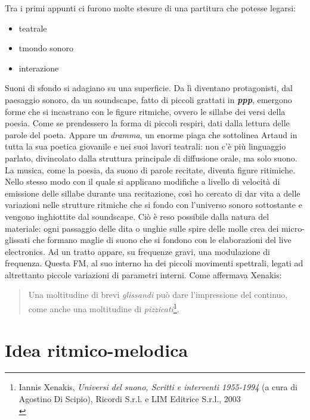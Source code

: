 Tra i primi appunti ci furono molte stesure di una partitura che potesse legarsi: 
\begin{itemize}
\item{teatrale}
\item{tmondo sonoro}
\item{interazione}
\end{itemize}

Suoni di sfondo si adagiano su una superficie. Da lì diventano protagonisti, dal paesaggio sonoro, da un soundscape, fatto di piccoli grattati in \textbf{\textit{ppp}}, emergono forme che si incastrano con le figure ritmiche, ovvero le sillabe dei versi della poesia. Come se prendessero la forma di piccoli respiri, dati dalla lettura delle parole del poeta. Appare un \textit{dramma}, un enorme piaga che sottolinea Artaud in tutta la sua poetica giovanile e nei suoi lavori teatrali: non c'è più linguaggio parlato, divincolato dalla struttura principale di diffusione orale, ma solo suono. La musica, come la poesia, da suono di parole recitate, diventa figure ritimiche. \\
Nello stesso modo con il quale si applicano modifiche a livello di velocità di emissione delle sillabe durante una recitazione, così ho cercato di dar vita a delle variazioni nelle strutture ritmiche che si fondo con l'universo sonoro sottostante e vengono inghiottite dal soundscape. Ciò è reso possibile dalla natura del materiale: ogni passaggio delle dita o unghie sulle spire delle molle crea dei micro-glissati che formano maglie di suono che si fondono con le elaborazioni del live electronics. Ad un tratto appare, su frequenze gravi, una modulazione di frequenza. Questa FM, al suo interno ha dei piccoli movimenti spettrali, legati ad altrettanto piccole variazioni di parametri interni. Come affermava Xenakis:
\begin{quotation}
Una moltitudine di brevi \textit{glissandi} può dare l'impressione del continuo, come anche una moltitudine di \textit{pizzicati}\footnote{Iannis Xenakis, \textit{Universi del suono, Scritti e interventi 1955-1994} (a cura di Agostino Di Scipio), Ricordi S.r.l. e LIM Editrice S.r.l., 2003 \\}.
\end{quotation}




\section{Idea ritmico-melodica}

